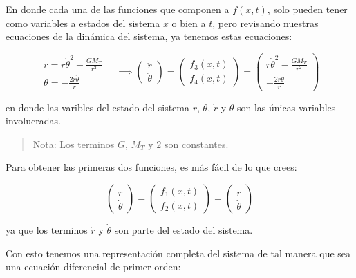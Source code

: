 \documentclass{article}
\begin{document}
    En donde cada una de las funciones que componen a \(f(x, t)\), solo
pueden tener como variables a estados del sistema \(x\) o bien a \(t\),
pero revisando nuestras ecuaciones de la dinámica del sistema, ya
tenemos estas ecuaciones:

    \begin{equation}
\begin{matrix}
\ddot{r} = r \dot{\theta}^2 - \frac{GM_T}{r^2} \\
\ddot{\theta} = - \frac{2 \dot{r} \dot{\theta}}{r}
\end{matrix} \quad \implies
\begin{pmatrix}
\ddot{r} \\
\ddot{\theta}
\end{pmatrix} = 
\begin{pmatrix}
f_3(x, t) \\
f_4(x, t)
\end{pmatrix} =
\begin{pmatrix}
r \dot{\theta}^2 - \frac{GM_T}{r^2} \\
- \frac{2 \dot{r} \dot{\theta}}{r}
\end{pmatrix}
\end{equation}

    en donde las varibles del estado del sistema \(r\), \(\theta\),
\(\dot{r}\) y \(\dot{\theta}\) son las únicas variables involucradas.

\begin{quote}
Nota: Los terminos \(G\), \(M_T\) y \(2\) son constantes.
\end{quote}

    Para obtener las primeras dos funciones, es más fácil de lo que crees:

    \begin{equation}
\begin{pmatrix}
\dot{r} \\
\dot{\theta}
\end{pmatrix} = 
\begin{pmatrix}
f_1(x, t) \\
f_2(x, t)
\end{pmatrix} =
\begin{pmatrix}
\dot{r} \\
\dot{\theta}
\end{pmatrix}
\end{equation}

    ya que los terminos \(\dot{r}\) y \(\dot{\theta}\) son parte del estado
del sistema.

    Con esto tenemos una representación completa del sistema de tal manera
que sea una ecuación diferencial de primer orden:
\end{document}
